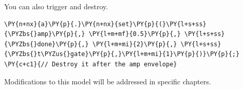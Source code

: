 You can also trigger and destroy.

    \begin{tcolorbox}[breakable, size=fbox, boxrule=1pt, pad at break*=1mm,colback=cellbackground, colframe=cellborder]
\begin{Verbatim}[commandchars=\\\{\}]
\PY{n+nx}{a}\PY{p}{.}\PY{n+nx}{set}\PY{p}{(}\PY{l+s+ss}{\PYZbs{}amp}\PY{p}{,} \PY{l+m+mf}{0.5}\PY{p}{,} \PY{l+s+ss}{\PYZbs{}done}\PY{p}{,} \PY{l+m+mi}{2}\PY{p}{,} \PY{l+s+ss}{\PYZbs{}t\PYZus{}gate}\PY{p}{,}\PY{l+m+mi}{1}\PY{p}{)}\PY{p}{;} \PY{c+c1}{// Destroy it after the amp envelope}
\end{Verbatim}
\end{tcolorbox}

Modifications to this model will be addressed in specific chapters.
